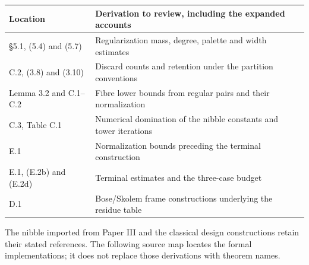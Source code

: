 \documentclass[english,11pt,a4paper]{article}
\newcounter{none}
\begin{document}
{\def\LTcaptype{none} %
\begin{longtable}[c]{@{}
  >{\raggedright\arraybackslash}p{}
  >{\raggedright\arraybackslash}p{}@{}}
\toprule\noalign{}
\begin{minipage}[b]{\linewidth}\raggedright
Location
\end{minipage} & \begin{minipage}[b]{\linewidth}\raggedright
Derivation to review, including the expanded accounts
\end{minipage} \\
\midrule\noalign{}
\endhead
\bottomrule\noalign{}
\endlastfoot
§5.1, (5.4) and (5.7) & Regularization mass, degree, palette and width estimates \\
C.2, (3.8) and (3.10) & Discard counts and retention under the partition conventions \\
Lemma 3.2 and C.1--C.2 & Fibre lower bounds from regular pairs and their normalization \\
C.3, Table C.1 & Numerical domination of the nibble constants and tower iterations \\
E.1 & Normalization bounds preceding the terminal construction \\
E.1, (E.2b) and (E.2d) & Terminal estimates and the three-case budget \\
D.1 & Bose/Skolem frame constructions underlying the residue table \\
\end{longtable}
}

The nibble imported from Paper III and the classical design constructions retain their stated references. The following source map locates the formal implementations; it does not replace those derivations with theorem names.
\end{document}
